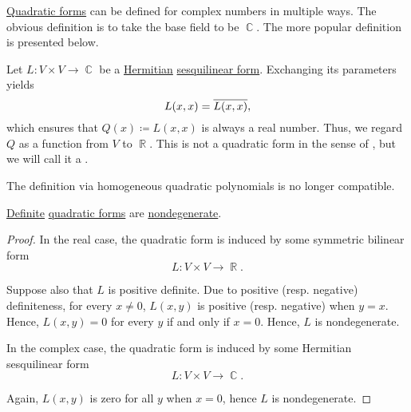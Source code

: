 \begin{remark}\label{rem:complex_quadratic_form}
  \hyperref[thm:quadratic_forms]{Quadratic forms} can be defined for complex numbers in multiple ways. The obvious definition is to take the base field to be \( \BbbC \). The more popular definition is presented below.

  Let \( L: V \times V \to \BbbC \) be a \hyperref[def:hermitian_form]{Hermitian} \hyperref[def:sesquilinear_form]{sesquilinear form}. Exchanging its parameters yields
  \begin{equation*}
    L(x, x) = \oline {L(x, x)},
  \end{equation*}
  which ensures that \( Q(x) \coloneqq L(x, x) \) is always a real number. Thus, we regard \( Q \) as a function from \( V \) to \( \BbbR \). This is not a quadratic form in the sense of , but we will call it a .

  The definition via homogeneous quadratic polynomials is no longer compatible.
\end{remark}

\begin{proposition}\label{thm:quadratic_forms_are_nondegenerate}
  \hyperref[def:real_function_definiteness]{Definite} \hyperref[thm:quadratic_forms]{quadratic forms} are \hyperref[def:degenerate_bilinear_form]{nondegenerate}.
\end{proposition}
\begin{proof}
  In the real case, the quadratic form is induced by some symmetric bilinear form
  \begin{equation*}
    L: V \times V \to \BbbR.
  \end{equation*}

  Suppose also that \( L \) is positive definite. Due to positive (resp. negative) definiteness, for every \( x \neq 0 \), \( L(x, y) \) is positive (resp. negative) when \( y = x \). Hence, \( L(x, y) = 0 \) for every \( y \) if and only if \( x = 0 \). Hence, \( L \) is nondegenerate.

  In the complex case, the quadratic form is induced by some Hermitian sesquilinear form
  \begin{equation*}
    L: V \times V \to \BbbC.
  \end{equation*}

  Again, \( L(x, y) \) is zero for all \( y \) when \( x = 0 \), hence \( L \) is nondegenerate.
\end{proof}

